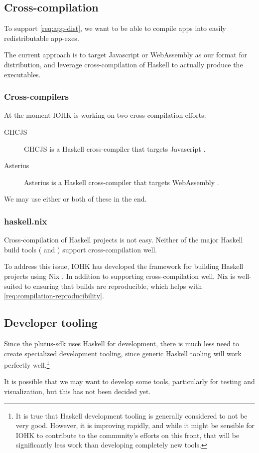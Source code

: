 \subsection{Cross-compilation}
\label{sec:cross-compilation}

To support \cref{req:app-dist}, we want to be able to compile \glspl{app} into easily redistributable \glspl{app-exe}.

The current approach is to target Javascript or WebAssembly as our format for distribution, and leverage cross-compilation of Haskell to actually produce the executables.

\subsubsection{Cross-compilers}

At the moment IOHK is working on two cross-compilation efforts:
\begin{description}
  \item[GHCJS] GHCJS is a Haskell cross-compiler that targets Javascript \autocite{ghcjs-repo}.
  \item[Asterius] Asterius is a Haskell cross-compiler that targets WebAssembly \autocite{asterius-repo}.
\end{description}

\noindent We may use either or both of these in the end.

\subsubsection{haskell.nix}

Cross-compilation of Haskell projects is not easy.
Neither of the major Haskell build tools ( and ) support cross-compilation well.

To address this issue, IOHK has developed the  framework for building Haskell projects using Nix \autocite{haskell-nix-repo}.
In addition to supporting cross-compilation well, Nix is well-suited to ensuring that builds are reproducible, which helps with \cref{req:compilation-reproducibility}.

\subsection{Developer tooling}
\label{sec:tooling}

Since the \gls{plutus-sdk} uses Haskell for development, there is much less need to create specialized development tooling, since generic Haskell tooling will work perfectly well.\footnote{
It is true that Haskell development tooling is generally considered to not be very good.
However, it is improving rapidly, and while it might be sensible for IOHK to contribute to the community's efforts on this front, that will be significantly less work than developing completely new tools.
}

It is possible that we may want to develop some tools, particularly for testing and visualization, but this has not been decided yet.
